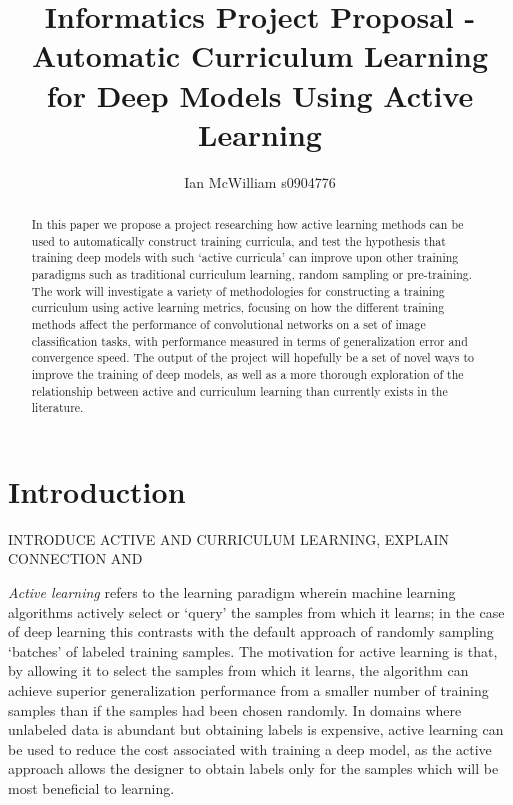 \documentclass[a4paper,11pt]{article}
\begin{document}
\title{Informatics Project Proposal - Automatic Curriculum Learning for Deep Models Using Active Learning}
\author{Ian McWilliam s0904776}
\date{}
\maketitle

\begin{abstract}
In this paper we propose a project researching how active learning methods can be used to automatically construct training curricula, and test the hypothesis that training deep models with such `active curricula' can improve upon other training paradigms such as traditional curriculum learning, random sampling or pre-training. The work will investigate a variety of methodologies for constructing a training curriculum using active learning metrics, focusing on how the different training methods affect the performance of convolutional networks on a set of image classification tasks, with performance measured in terms of generalization error and convergence speed. The output of the project will hopefully be a set of novel ways to improve the training of deep models, as well as a more thorough exploration of the relationship between active and curriculum learning than currently exists in the literature.
\end{abstract}

\section{Introduction}

INTRODUCE ACTIVE AND CURRICULUM LEARNING, EXPLAIN CONNECTION AND 

\textit{Active learning} refers to the learning paradigm wherein machine learning algorithms actively select or `query' the samples from which it learns; in the case of deep learning this contrasts with the default approach of randomly sampling `batches' of labeled training samples. The motivation for active learning is that, by allowing it to select the samples from which it learns, the algorithm can achieve superior generalization performance from a smaller number of training samples than if the samples had been chosen randomly. In domains where unlabeled data is abundant but obtaining labels is expensive, active learning can be used to reduce the cost associated with training a deep model, as the active approach allows the designer to obtain labels only for the samples which will be most beneficial to learning.
\end{document}
